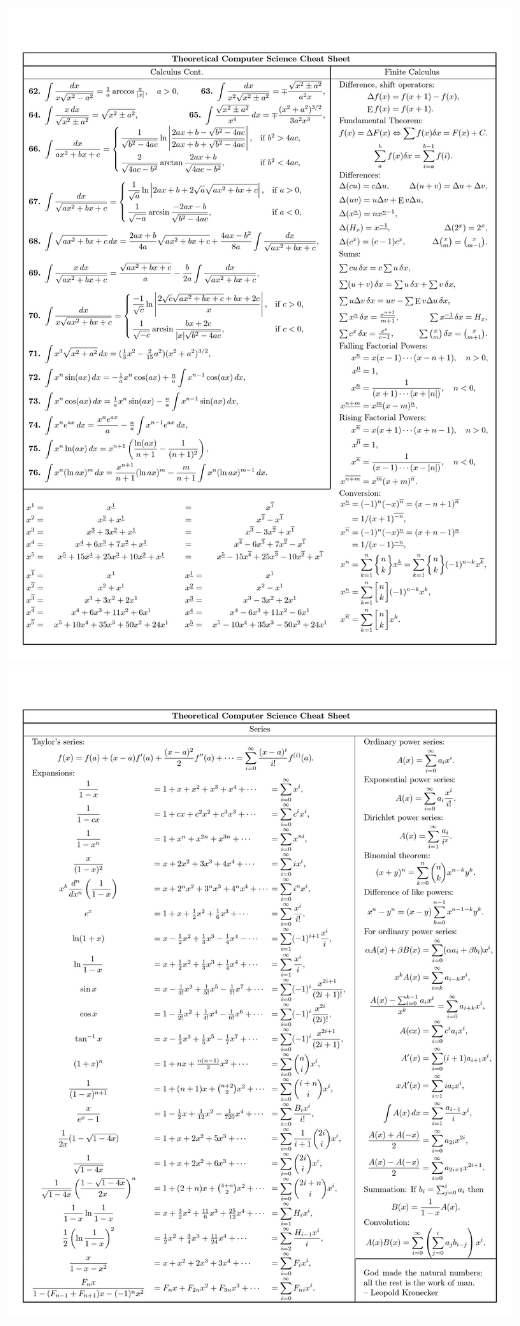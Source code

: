 \documentclass{article}
\begin{document}
\newpage
\includegraphics[trim = 6mm 2mm 0mm 10mm,clip=true,scale = 0.73]{./images/image-0008.jpg}
\newpage
\includegraphics[trim = 6mm 2mm 0mm 10mm,clip=true,scale = 0.73]{./images/image-0009.jpg}
\end{document}
